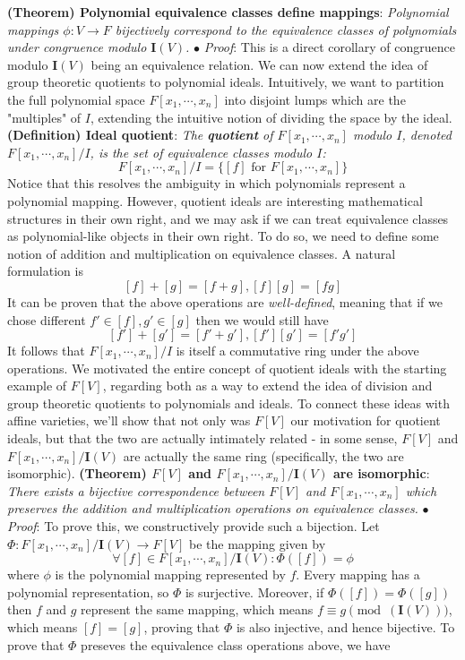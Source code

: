 \documentclass{article}
\newcommand*{\tb}{\textbf}
\newcommand*{\ti}{\textit}
\newcommand*{\n}{\newline}
\newcommand*{\nn}{\newline \newline}
\newcommand*{\Pf}{\indent \ensuremath{\bullet} \textit{Proof}: }
\newcommand*{\Fx}{\ensuremath{F[x_1, \cdots, x_n]}}
\newcommand*{\IV}{\ensuremath{\mathbf{I}(V)}}
\begin{document}
\nn
\tb{(Theorem) Polynomial equivalence classes define mappings}: \ti{Polynomial mappings $ \phi: V \rightarrow F $ bijectively correspond to the equivalence classes of polynomials under congruence modulo $ \IV $.}
\n
\Pf This is a direct corollary of congruence modulo $ \IV $ being an equivalence relation.
\nn
We can now extend the idea of group theoretic quotients to polynomial ideals. Intuitively, we want to partition the full polynomial space $ \Fx $ into disjoint lumps which are the "multiples" of $ I $, extending the intuitive notion of dividing the space by the ideal.
\nn
\tb{(Definition) Ideal quotient}: \ti{The \tb{quotient} of $ \Fx $ modulo $ I $, denoted $ \Fx / I $, is the set of equivalence classes modulo $ I $:}
$$ \Fx / I = \{ [ f ] \text{ for } \Fx \} $$
Notice that this resolves the ambiguity in which polynomials represent a polynomial mapping. However, quotient ideals are interesting mathematical structures in their own right, and we may ask if we can treat equivalence classes as polynomial-like objects in their own right. To do so, we need to define some notion of addition and multiplication on equivalence classes. A natural formulation is
$$ [ f ] + [ g ] = [ f + g ], [ f ] [ g ] = [ f g ] $$
It can be proven that the above operations are \ti{well-defined}, meaning that if we chose different $ f' \in [ f ], g' \in [ g ] $ then we would still have
$$ [ f' ] + [ g' ] = [ f' + g' ], [ f' ] [ g' ] = [ f' g' ] $$
It follows that $ \Fx / I $ is itself a commutative ring under the above operations.
\n
We motivated the entire concept of quotient ideals with the starting example of $ F[V] $, regarding both as a way to extend the idea of division and group theoretic quotients to polynomials and ideals. To connect these ideas with affine varieties, we'll show that not only was $ F[V] $ our motivation for quotient ideals, but that the two are actually intimately related - in some sense, $ F[V] $ and $ \Fx / \IV $ are actually the same ring (specifically, the two are isomorphic).
\nn
\tb{(Theorem) $ F[V] $ and $ \Fx / \IV $ are isomorphic}: \ti{There exists a bijective correspondence between $ F[V] $ and $ \Fx $ which preserves the addition and multiplication operations on equivalence classes.}
\n
\Pf To prove this, we constructively provide such a bijection. Let $ \Phi: \Fx / \IV \rightarrow F[V] $ be the mapping given by
$$ \forall [ f ] \in \Fx / \IV: \Phi([ f ]) = \phi $$
where $ \phi $ is the polynomial mapping represented by $ f $. Every mapping has a polynomial representation, so $ \Phi $ is surjective. Moreover, if $ \Phi([ f ]) = \Phi([ g ]) $ then $ f $ and $ g $ represent the same mapping, which means $ f \equiv g \pmod(\IV) $, which means $ [ f ] = [ g ] $, proving that $ \Phi $ is also injective, and hence bijective. To prove that $ \Phi $ preseves the equivalence class operations above, we have
\end{document}
